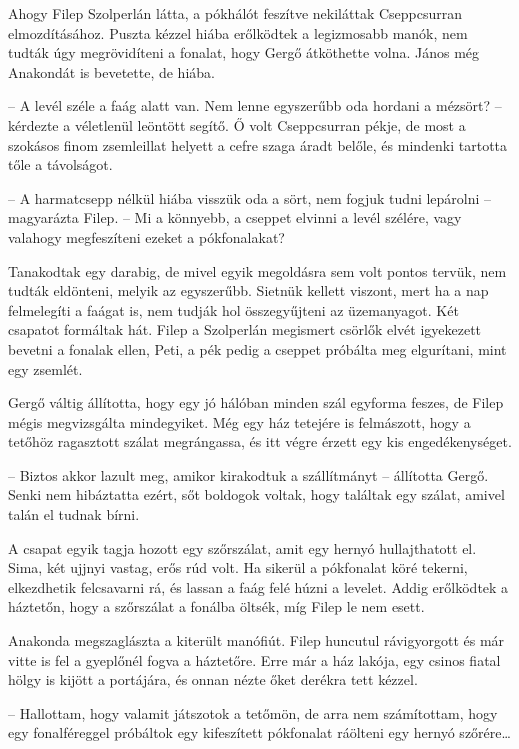 \documentclass[10pt]{memoir}
\begin{document}
Ahogy Filep Szolperlán látta, a pókhálót feszítve nekiláttak Cseppcsurran
elmozdításához. Puszta kézzel hiába erőlködtek a legizmosabb manók, nem tudták
úgy megrövidíteni a fonalat, hogy Gergő átköthette volna. János még Anakondát
is bevetette, de hiába.

-- A levél széle a faág alatt van. Nem lenne egyszerűbb oda hordani a mézsört?
-- kérdezte a véletlenül leöntött segítő. Ő volt Cseppcsurran pékje, de most a
szokásos finom zsemleillat helyett a cefre szaga áradt belőle, és mindenki
tartotta tőle a távolságot.

-- A harmatcsepp nélkül hiába visszük oda a sört, nem fogjuk tudni lepárolni
-- magyarázta Filep. -- Mi a könnyebb, a cseppet elvinni a levél szélére,
vagy valahogy megfeszíteni ezeket a pókfonalakat?

Tanakodtak egy darabig, de mivel egyik megoldásra sem volt pontos tervük, nem
tudták eldönteni, melyik az egyszerűbb. Sietnük kellett viszont, mert ha a nap
felmelegíti a faágat is, nem tudják hol összegyűjteni az üzemanyagot. Két
csapatot formáltak hát. Filep a Szolperlán megismert csörlők elvét igyekezett
bevetni a fonalak ellen, Peti, a pék pedig a cseppet próbálta meg elgurítani,
mint egy zsemlét.

Gergő váltig állította, hogy egy jó hálóban minden szál egyforma feszes, de
Filep mégis megvizsgálta mindegyiket. Még egy ház tetejére is felmászott, hogy
a tetőhöz ragasztott szálat megrángassa, és itt végre érzett egy kis
engedékenységet.

-- Biztos akkor lazult meg, amikor kirakodtuk a szállítmányt -- állította
Gergő.  Senki nem hibáztatta ezért, sőt boldogok voltak, hogy találtak egy
szálat, amivel talán el tudnak bírni.

A csapat egyik tagja hozott egy szőrszálat, amit egy hernyó hullajthatott el.
Sima, két ujjnyi vastag, erős rúd volt. Ha sikerül a pókfonalat köré tekerni,
elkezdhetik felcsavarni rá, és lassan a faág felé húzni a levelet. Addig
erőlködtek a háztetőn, hogy a szőrszálat a fonálba öltsék, míg Filep le nem
esett.

Anakonda megszaglászta a kiterült manófiút. Filep huncutul rávigyorgott és már
vitte is fel a gyeplőnél fogva a háztetőre. Erre már a ház lakója, egy csinos
fiatal hölgy is kijött a portájára, és onnan nézte őket derékra tett kézzel.

-- Hallottam, hogy valamit játszotok a tetőmön, de arra nem számítottam, hogy
egy fonalféreggel próbáltok egy kifeszített pókfonalat ráölteni egy hernyó
szőrére\dots
\end{document}
